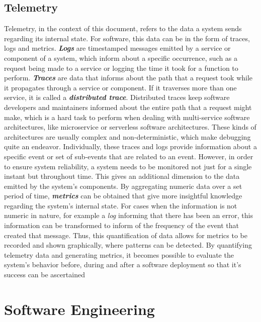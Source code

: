 \subsection{Telemetry}\label{state-of-the-art:ss:telemetry}

Telemetry, in the context of this document, refers to the data a system sends regarding its internal state. For software, this data can be in the form of traces, logs and metrics.
\textbf{\textit{Logs}} are timestamped messages emitted by a service or component of a system, which inform about a specific occurrence, such as a request being made to a service or logging the time it took for a function to perform.
\textbf{\textit{Traces}} are data that informs about the path that a request took while it propagates through a service or component. If it traverses more than one service, it is called a \textbf{\textit{distributed trace}}. Distributed traces keep software developers and maintainers informed about the entire path that a request might make, which is a hard task to perform when dealing with multi-service software architectures, like microservice or serverless software architectures. These kinds of architectures are usually complex and non-deterministic, which make debugging quite an endeavor. Individually, these traces and logs provide information about a specific event or set of sub-events that are related to an event. However, in order to ensure system reliability, a system needs to be monitored not just for a single instant but throughout time. This gives an additional dimension to the data emitted by the system's components. By aggregating numeric data over a set period of time, \textbf{\textit{metrics}} can be obtained that give more insightful knowledge regarding the system's internal state. For cases when the information is not numeric in nature, for example a \textit{log} informing that there has been an error, this information can be transformed to inform of the frequency of the event that created that message. Thus, this quantification of data allows for metrics to be recorded and shown graphically, where patterns can be detected. By quantifying telemetry data and generating metrics, it becomes possible to evaluate the system's behavior before, during and after a software deployment so that it's success can be ascertained \Parencite{mills1988software}


\section{Software Engineering}\label{state-of-the-art:s:software-engineering}

